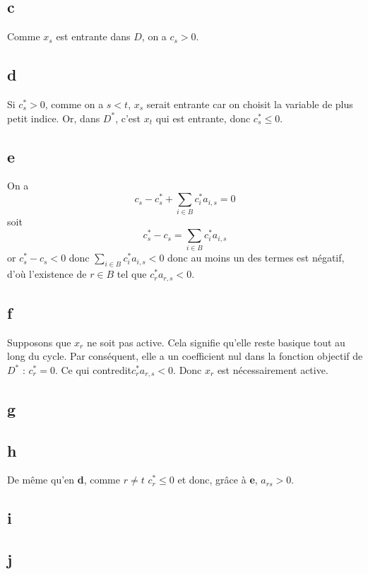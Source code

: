 \subsection*{c}

Comme $x_s$ est entrante dans $D$, on a $c_s > 0$. 

\subsection*{d}

Si $c^*_s > 0$, comme on a $s<t$, $x_s$ serait entrante car on choisit la variable de plus petit indice. Or, dans $D^*$, c'est $x_t$ qui est entrante, donc $c^*_s \leqslant 0$.

\subsection*{e}

On a 
\[
    c_s - c^*_s + \sum\limits_{i\in B} c_i^*  a_{i,s} =0
\]
soit
\[
    c^*_s - c_s = \sum\limits_{i\in B} c_i^*  a_{i,s}
\]
or $c^*_s - c_s<0$ donc $\sum\limits_{i\in B} c_i^*  a_{i,s} < 0$ donc au moins un des termes est négatif, d'où l'existence de $r\in B$ tel que $c_r^*a_{r,s} < 0$.

\subsection*{f}

Supposons que $x_r$ ne soit pas active. Cela signifie qu'elle reste basique tout au long du cycle. Par conséquent, elle a un coefficient nul dans la fonction objectif de $D^*$ : $c^*_r = 0$. Ce qui contredit$c_r^*a_{r,s} < 0$. Donc $x_r$ est nécessairement active.

\subsection*{g}
\subsection*{h}

De même qu'en \textbf{d}, comme $r\neq t$ $c_r^* \leqslant 0$ et donc, grâce à \textbf{e}, $a_{rs}>0$.

\subsection*{i}
\subsection*{j}

